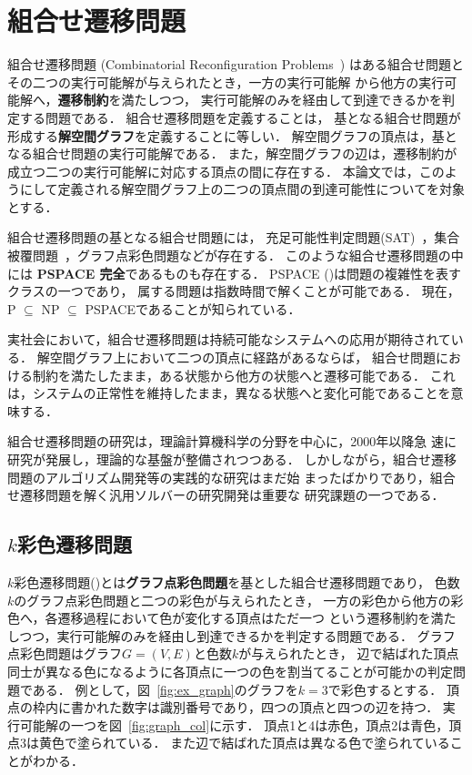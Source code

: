 \section{組合せ遷移問題} \label{chap:background}
組合せ遷移問題 (Combinatorial Reconfiguration Problems~\cite{Ito18:tohoku})
はある組合せ問題とその二つの実行可能解が与えられたとき，一方の実行可能解
から他方の実行可能解へ，\textbf{遷移制約}を満たしつつ，
実行可能解のみを経由して到達できるかを判定する問題である．
組合せ遷移問題を定義することは，
基となる組合せ問題が形成する\textbf{解空間グラフ}を定義することに等しい．
解空間グラフの頂点は，基となる組合せ問題の実行可能解である． 
また，解空間グラフの辺は，遷移制約が成立つ二つの実行可能解に対応する頂点の間に存在する．
本論文では，このようにして定義される解空間グラフ上の二つの頂点間の到達可能性についてを対象とする．

組合せ遷移問題の基となる組合せ問題には，
充足可能性判定問題(SAT)~\cite{sat_core:2009}，集合被覆問題~\cite{Ito:2011}，グラフ点彩色問題などが存在する．
このような組合せ遷移問題の中には \textbf{PSPACE 完全}であるものも存在する． 
PSPACE (\cite{Kuriyama13:ieice})は問題の複雑性を表すクラスの一つであり，
属する問題は指数時間で解くことが可能である． 
現在，P $\subseteq$ NP $\subseteq$ PSPACEであることが知られている．

実社会において，組合せ遷移問題は持続可能なシステムへの応用が期待されている． 
解空間グラフ上において二つの頂点に経路があるならば，
組合せ問題における制約を満たしたまま，ある状態から他方の状態へと遷移可能である． 
これは，システムの正常性を維持したまま，異なる状態へと変化可能であることを意味する．

組合せ遷移問題の研究は，理論計算機科学の分野を中心に，2000年以降急
速に研究が発展し，理論的な基盤が整備されつつある．
しかしながら，組合せ遷移問題のアルゴリズム開発等の実践的な研究はまだ始
まったばかりであり，組合せ遷移問題を解く汎用ソルバーの研究開発は重要な
研究課題の一つである．

\subsection{$k$彩色遷移問題}
$k$彩色遷移問題(\cite{BC2009:tcs})とは\textbf{グラフ点彩色問題}を基とした組合せ遷移問題であり， 
色数$k$のグラフ点彩色問題と二つの彩色が与えられたとき，
一方の彩色から他方の彩色へ，各遷移過程において色が変化する頂点はただ一つ
という遷移制約を満たしつつ，実行可能解のみを経由し到達できるかを判定する問題である．
グラフ点彩色問題はグラフ$G=(V, E)$と色数$k$が与えられたとき，
辺で結ばれた頂点同士が異なる色になるように各頂点に一つの色を割当てることが可能かの判定問題である． 
例として，図~\ref{fig:ex_graph}のグラフを$k=3$で彩色するとする．
頂点の枠内に書かれた数字は識別番号であり，四つの頂点と四つの辺を持つ．
実行可能解の一つを図~\ref{fig:graph_col}に示す．
頂点1と4は赤色，頂点2は青色，頂点3は黄色で塗られている．
また辺で結ばれた頂点は異なる色で塗られていることがわかる．

